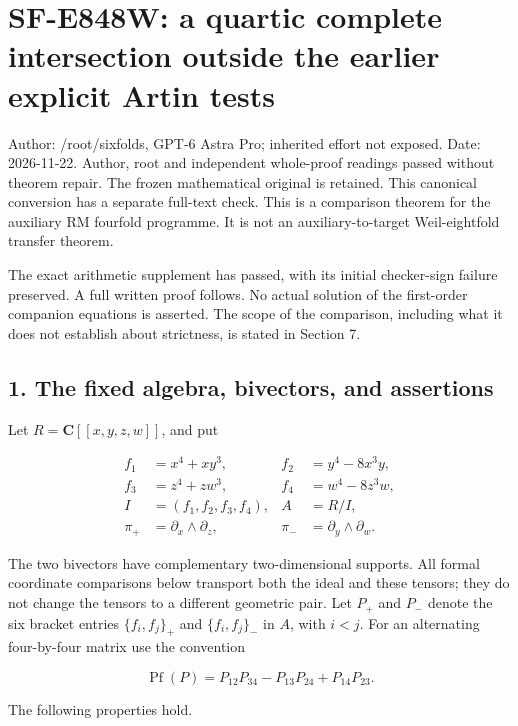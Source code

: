 \section{SF-E848W: a quartic complete intersection outside the earlier explicit Artin tests}\label{SF-E848W:section}

Author: /root/sixfolds, GPT-6 Astra Pro; inherited effort not exposed.
Date: 2026-11-22. Author, root and independent whole-proof readings passed without theorem repair. The frozen mathematical original is retained.
This canonical conversion has a separate full-text check.
This is a comparison theorem for the auxiliary RM fourfold programme.
It is not an auxiliary-to-target Weil-eightfold transfer theorem.

The exact arithmetic supplement has passed, with its initial checker-sign
failure preserved. A full written proof follows. No actual solution of the
first-order companion equations is asserted. The scope of the comparison,
including what it does not establish about strictness, is stated in Section 7.

\subsection{1. The fixed algebra, bivectors, and assertions}\label{SF-E848W:s1}

Let \(R=\mathbf C[[x,y,z,w]]\), and put

\[
\begin{split}
 f_1&=x^4+xy^3,& f_2&=y^4-8x^3y,\\
 f_3&=z^4+zw^3,& f_4&=w^4-8z^3w,\\
 I&=(f_1,f_2,f_3,f_4),& A&=R/I,\\
 \pi_+&=\partial_x\wedge\partial_z,&
 \pi_-&=\partial_y\wedge\partial_w.
\end{split}
\tag{QW.1}
\]

The two bivectors have complementary two-dimensional supports. All formal
coordinate comparisons below transport both the ideal and these tensors;
they do not change the tensors to a different geometric pair.
Let \(P_+\) and \(P_-\) denote the six bracket entries \(\{f_i,f_j\}_+\) and \(\{f_i,f_j\}_-\)
in \(A\), with \(i<j\). For an alternating four-by-four matrix use the convention

\[
 \operatorname{Pf}(P)=P_{12}P_{34}-P_{13}P_{24}+P_{14}P_{23}.
\tag{QW.2}
\]

The following properties hold.

